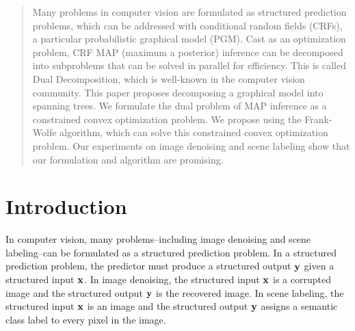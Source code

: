 \documentclass[conference]{IEEEtran}
\begin{document}
\maketitle


\begin{abstract}
Many problems in computer vision are formulated as structured prediction problems, which can be addressed with conditional random fields (CRFs), a particular probabilistic graphical model (PGM). Cast as an optimization problem, CRF MAP (maximum a posterior) inference can be decomposed into subproblems that can be solved in parallel for efficiency. This is called Dual Decomposition, which is well-known in the computer vision community. This paper proposes decomposing a graphical model into spanning trees. We formulate the dual problem of MAP inference as a constrained convex optimization problem. We propose using the Frank-Wolfe algorithm, which can solve this constrained convex optimization problem. Our experiments on image denoising and scene labeling show that our formulation and algorithm are promising.
\end{abstract}





%
\IEEEpeerreviewmaketitle



\section{Introduction}


In computer vision, many problems--including image denoising and scene labeling--can be formulated as a structured prediction problem. In a structured prediction problem, the predictor must produce a structured output ${\bf y}$ given a structured input ${\bf x}$. In image denoising, the structured input ${\bf x}$ is a corrupted image and the structured output ${\bf y}$ is the recovered image. In scene labeling, the structured input ${\bf x}$ is an image and the structured output ${\bf y}$ assigns a semantic class label to every pixel in the image.
\end{document}
